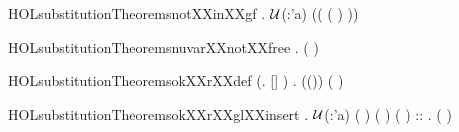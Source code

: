 \newcommand{\HOLsubstitutionTheoremsmuvarXXnotXXfree}{\UseVerbatim{HOLsubstitutionTheoremsmuvarXXnotXXfree}}
\begin{SaveVerbatim}{HOLsubstitutionTheoremsnotXXinXXgf}
\HOLTokenTurnstile{} \HOLSymConst{\HOLTokenForall{}}    .
      \ensuremath{\cal{U}}(:'a) \HOLSymConst{\HOLTokenImp{}}
       \HOLSymConst{\HOLTokenImp{}}
      \HOLConst{\HOLTokenNotIn{}}  ((\HOLSymConst{,} (  ) )\HOLSymConst{::}) 
\end{SaveVerbatim}
\newcommand{\HOLsubstitutionTheoremsnotXXinXXgf}{\UseVerbatim{HOLsubstitutionTheoremsnotXXinXXgf}}
\begin{SaveVerbatim}{HOLsubstitutionTheoremsnuvarXXnotXXfree}
\HOLTokenTurnstile{} \HOLSymConst{\HOLTokenForall{}} .  \HOLConst{\HOLTokenNotIn{}}  (  )
\end{SaveVerbatim}
\newcommand{\HOLsubstitutionTheoremsnuvarXXnotXXfree}{\UseVerbatim{HOLsubstitutionTheoremsnuvarXXnotXXfree}}
\begin{SaveVerbatim}{HOLsubstitutionTheoremsokXXrXXdef}
\HOLTokenTurnstile{} (\HOLSymConst{\HOLTokenForall{}}.  []  \HOLSymConst{\HOLTokenEquiv{}} ) \HOLSymConst{\HOLTokenConj{}}
   \HOLSymConst{\HOLTokenForall{}}   .
      ((\HOLSymConst{,})\HOLSymConst{::})  \HOLSymConst{\HOLTokenEquiv{}}
        \HOLSymConst{\HOLTokenConj{}} ( \HOLConst{\HOLTokenIn{}}    \HOLSymConst{\HOLTokenImp{}}  \HOLConst{\HOLTokenNotIn{}}   )
\end{SaveVerbatim}
\newcommand{\HOLsubstitutionTheoremsokXXrXXdef}{\UseVerbatim{HOLsubstitutionTheoremsokXXrXXdef}}
\begin{SaveVerbatim}{HOLsubstitutionTheoremsokXXrXXglXXinsert}
\HOLTokenTurnstile{} \HOLSymConst{\HOLTokenForall{}}  .
      \ensuremath{\cal{U}}(:'a) \HOLSymConst{\HOLTokenConj{}}   \HOLSymConst{\HOLTokenConj{}}   (  ) \HOLSymConst{\HOLTokenImp{}}
      (   ) (  ) \HOLSymConst{\HOLTokenConj{}}
     \HOLSymConst{\HOLTokenForall{}}::  .  (   )  \HOLSymConst{=}   
\end{SaveVerbatim}
